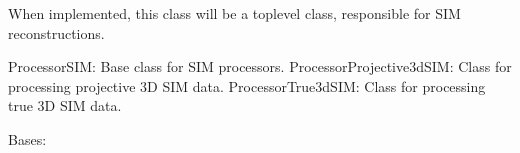 \documentclass[letterpaper,10pt,english]{sphinxmanual}
\begin{document}
\sphinxAtStartPar
When implemented, this class will be a top\sphinxhyphen{}level class, responsible for SIM reconstructions.
\begin{description}
\sphinxAtStartPar
ProcessorSIM: Base class for SIM processors.
ProcessorProjective3dSIM: Class for processing projective 3D SIM data.
ProcessorTrue3dSIM: Class for processing true 3D SIM data.

\end{description}


\begin{fulllineitems}
\label{\detokenize{source/ProcessorSIM:ProcessorSIM.ProcessorProjective3dSIM}}
\pysigstartsignatures
\pysiglinewithargsret
{}
{\sphinxparamcomma {}}
{}
\pysigstopsignatures
\sphinxAtStartPar
Bases: {\hyperref[\detokenize{source/ProcessorSIM:ProcessorSIM.ProcessorSIM}]{}}


\end{fulllineitems}

\end{document}
